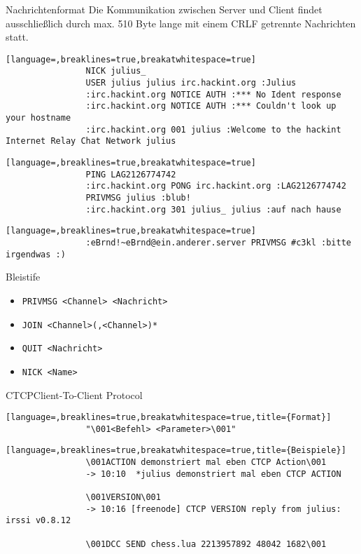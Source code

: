 \documentclass{beamer}
\begin{document}
		\begin{frame}[fragile,shrink=5]{Nachrichtenformat}
			Die Kommunikation zwischen Server und Client findet ausschließlich durch max. 510 Byte lange mit einem CRLF getrennte Nachrichten statt.
			
			\begin{lstlisting}[language=,breaklines=true,breakatwhitespace=true]
				NICK julius_
				USER julius julius irc.hackint.org :Julius
				:irc.hackint.org NOTICE AUTH :*** No Ident response
				:irc.hackint.org NOTICE AUTH :*** Couldn't look up your hostname
				:irc.hackint.org 001 julius :Welcome to the hackint Internet Relay Chat Network julius
			\end{lstlisting}
			
			\begin{lstlisting}[language=,breaklines=true,breakatwhitespace=true]
				PING LAG2126774742
				:irc.hackint.org PONG irc.hackint.org :LAG2126774742
				PRIVMSG julius :blub!
				:irc.hackint.org 301 julius_ julius :auf nach hause
			\end{lstlisting}
			
			\begin{lstlisting}[language=,breaklines=true,breakatwhitespace=true]
				:eBrnd!~eBrnd@ein.anderer.server PRIVMSG #c3kl :bitte irgendwas :)
			\end{lstlisting}
		\end{frame}

		\begin{frame}[fragile]{Bleistife}
			\begin{itemize}
				\item \verb+PRIVMSG <Channel> <Nachricht>+
				\item \verb+JOIN <Channel>(,<Channel>)*+
				\item \verb+QUIT <Nachricht>+
				\item \verb+NICK <Name>+
			\end{itemize}
		\end{frame}

		\begin{frame}[fragile,shrink=5]{CTCP}{Client-To-Client Protocol}
			\begin{lstlisting}[language=,breaklines=true,breakatwhitespace=true,title={Format}]
				"\001<Befehl> <Parameter>\001"
			\end{lstlisting}

			\begin{lstlisting}[language=,breaklines=true,breakatwhitespace=true,title={Beispiele}]
				\001ACTION demonstriert mal eben CTCP Action\001
				-> 10:10  *julius demonstriert mal eben CTCP ACTION

				\001VERSION\001
				-> 10:16 [freenode] CTCP VERSION reply from julius: irssi v0.8.12

				\001DCC SEND chess.lua 2213957892 48042 1682\001
			\end{lstlisting}
		\end{frame}
	
\end{document}
